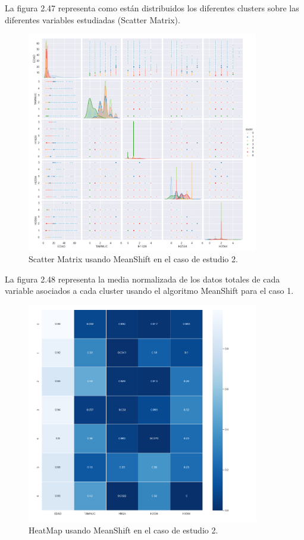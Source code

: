 	La figura 2.47 representa como están distribuidos los diferentes clusters sobre las diferentes variables estudiadas
	(Scatter Matrix).\\

	\begin{figure}[htb]
		\centering
		\includegraphics[width=0.9\textwidth]{./imagenes/caso2/scatterMatrix_caso2_MeanShift}
		\caption{Scatter Matrix usando MeanShift en el caso de estudio 2.} \label{fig:1}
	\end{figure}

	La figura 2.48 representa la media normalizada de los datos totales de cada variable asociados
	a cada cluster usando el algoritmo MeanShift para el caso 1. \\

	\begin{figure}[htb]
		\centering
		\includegraphics[width=0.9\textwidth]{./imagenes/caso2/heatmap_caso2_MeanShift}
		\caption{HeatMap usando MeanShift en el caso de estudio 2.} \label{fig:1}
	\end{figure}


